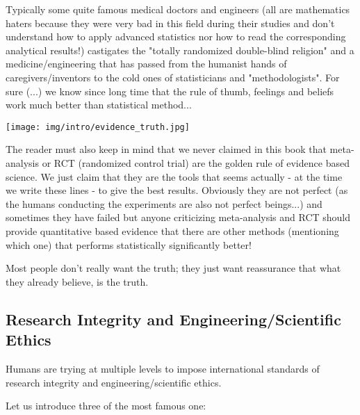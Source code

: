 	Typically some quite famous medical doctors and engineers (all are mathematics haters because they were very bad in this field during their studies and don't understand how to apply advanced statistics nor how to read the corresponding analytical results!) castigates the "totally randomized double-blind religion" and a medicine/engineering that has passed from the humanist hands of caregivers/inventors to the cold ones of statisticians and "methodologists". For sure (...) we know since long time that the rule of thumb, feelings and beliefs work much better than statistical method...
	\begin{center}
		\texttt{[image: img/intro/evidence\_truth.jpg]}
	\end{center}
	The reader must also keep in mind that we never claimed in this book that meta-analysis or RCT (randomized control trial) are the golden rule of evidence based science. We just claim that they are the tools that seems actually - at the time we write these lines - to give the best results. Obviously they are not perfect (as the humans conducting the experiments are also not perfect beings...) and sometimes they have failed but anyone criticizing meta-analysis and RCT should provide quantitative based evidence that there are other methods (mentioning which one) that performs statistically significantly better!
	
	\begin{fquote}Most people don't really want the truth; they just want reassurance that what they already believe, is the truth.
 	\end{fquote}
	
	\pagebreak
	\subsection{Research Integrity and Engineering/Scientific Ethics}
	Humans are trying at multiple levels to impose international standards of research integrity and engineering/scientific ethics.
	
	Let us introduce three of the most famous one:
